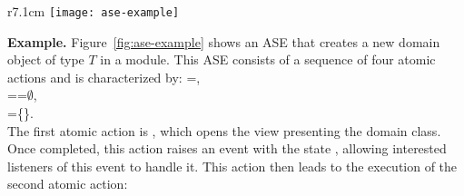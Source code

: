 {\makeatletter
	\let\par\@@par
	\par{}
	\everypar{}
	\begin{wrapfigure}{r}{7.1cm}
		\centering
		\vspace{-2.5cm}
		\texttt{[image: ase-example]}
		\vspace{-0.1cm}
		\caption{An ASE to create a domain object of type $T$.} %
		\vspace{-0.3cm}
		\label{fig:ase-example}
	\end{wrapfigure}
	
	\noindent\textbf{Example.} 
	Figure~\ref{fig:ase-example} shows an ASE that creates a new domain object of type $T$ in a module. This ASE consists of a sequence of four atomic actions and is characterized by: %
	=,\\
	==$\emptyset$,\\
	=\{\}.\\
	The first atomic action is , which opens the view presenting the domain class. Once completed, this action raises an event with the state , allowing interested listeners of this event to handle it. This action then leads to the execution of the second atomic action:%
	\par}
